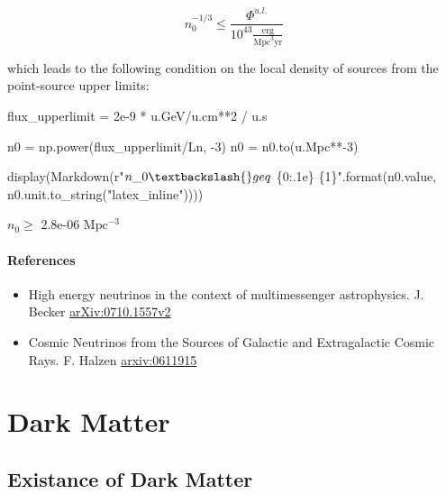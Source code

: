 \documentclass[
  letterpaper,
  DIV=11,
  numbers=noendperiod]{scrreprt}
\newenvironment{Shaded}{\begin{snugshade}}{\end{snugshade}}
\newcommand{\BuiltInTok}[1]{\textcolor[rgb]{0.00,0.23,0.31}{#1}}
\newcommand{\DecValTok}[1]{\textcolor[rgb]{0.68,0.00,0.00}{#1}}
\newcommand{\FloatTok}[1]{\textcolor[rgb]{0.68,0.00,0.00}{#1}}
\newcommand{\NormalTok}[1]{\textcolor[rgb]{0.00,0.23,0.31}{#1}}
\newcommand{\OperatorTok}[1]{\textcolor[rgb]{0.37,0.37,0.37}{#1}}
\newcommand{\SpecialCharTok}[1]{\textcolor[rgb]{0.37,0.37,0.37}{#1}}
\newcommand{\StringTok}[1]{\textcolor[rgb]{0.13,0.47,0.30}{#1}}
\newcommand{\VerbatimStringTok}[1]{\textcolor[rgb]{0.13,0.47,0.30}{#1}}
\providecommand{\tightlist}{%
  \setlength{\itemsep}{0pt}\setlength{\parskip}{0pt}}\usepackage{longtable,booktabs,array}
\begin{document}
\[n_0^{-1/3} \leq \frac{\Phi^{u.l.}}{10^{43}\frac{\mathrm{erg}}{\mathrm{Mpc}^3\mathrm{yr}}}\]

which leads to the following condition on the local density of sources
from the point-source upper limits:

\begin{Shaded}
\begin{Highlighting}[]
\NormalTok{flux\_upperlimit }\OperatorTok{=} \FloatTok{2e{-}9} \OperatorTok{*}\NormalTok{ u.GeV}\OperatorTok{/}\NormalTok{u.cm}\OperatorTok{**}\DecValTok{2} \OperatorTok{/}\NormalTok{ u.s}

\NormalTok{n0 }\OperatorTok{=}\NormalTok{ np.power(flux\_upperlimit}\OperatorTok{/}\NormalTok{Ln, }\OperatorTok{{-}}\DecValTok{3}\NormalTok{)}
\NormalTok{n0 }\OperatorTok{=}\NormalTok{ n0.to(u.Mpc}\OperatorTok{**{-}}\DecValTok{3}\NormalTok{)}

\NormalTok{display(Markdown(}\VerbatimStringTok{r"$n\_0 \textbackslash{}geq$ }\SpecialCharTok{\{0:.1e\}}\VerbatimStringTok{ }\SpecialCharTok{\{1\}}\VerbatimStringTok{"}\NormalTok{.}\BuiltInTok{format}\NormalTok{(n0.value, n0.unit.to\_string(}\StringTok{"latex\_inline"}\NormalTok{))))}
\end{Highlighting}
\end{Shaded}

\(n_0 \geq\) 2.8e-06 \(\mathrm{Mpc^{-3}}\)

\subsubsection{References}\label{references-2}

\begin{itemize}
\tightlist
\item
  High energy neutrinos in the context of multimessenger astrophysics.
  J. Becker \href{https://arxiv.org/abs/0710.1557}{arXiv:0710.1557v2}
\item
  Cosmic Neutrinos from the Sources of Galactic and Extragalactic Cosmic
  Rays. F. Halzen
  \href{https://arxiv.org/pdf/astro-ph/0611915.pdf}{arxiv:0611915}
\end{itemize}


\chapter{Dark Matter}\label{dark-matter}

\section{Existance of Dark Matter}\label{existance-of-dark-matter}
\end{document}
